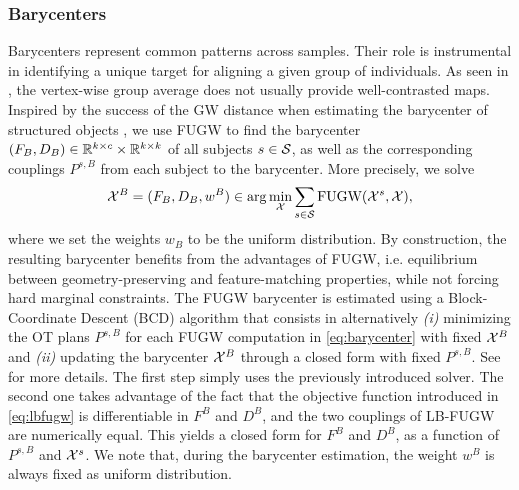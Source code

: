 \subsubsection{Barycenters}
Barycenters represent common patterns across samples.
Their role is instrumental in identifying a unique target for aligning a given group of individuals.
As seen in , the vertex-wise group average does not usually provide
well-contrasted maps.
Inspired by the success of the GW distance when estimating the barycenter of structured objects
\citep{Peyre16,Vayer19b}, we use FUGW to find the barycenter
$(F_B, D_B) \in \mathbb R^{k \times c} \times \mathbb R^{k \times k}$
of all subjects $s \in \mathcal S$, as well as the corresponding couplings $P^{s,B}$ from each subject
to the barycenter. More precisely, we solve
\begin{equation}
    \label{eq:barycenter}
    \mathcal X^B = (F_B, D_B, w^B) \in \arg\min_{\mathcal X}  \sum_{s \in \mathcal S} \text{FUGW}(\mathcal X^s, \mathcal X),
\end{equation}
where we set the weights $w_B$ to be the uniform distribution.
By construction, the resulting barycenter benefits from the advantages of FUGW,
i.e. equilibrium between geometry-preserving and feature-matching properties,
while not forcing hard marginal constraints. The FUGW barycenter is estimated
using a Block-Coordinate Descent (BCD) algorithm that consists in alternatively
\textit{(i)} minimizing the OT plans $P^{s,B}$ for each FUGW computation
in \eqref{eq:barycenter} with fixed $\mathcal X^B$ and \textit{(ii)}
updating the barycenter $\mathcal X^B$ through a closed form with fixed $P^{s,B}$.
See  for more details.
The first step simply uses the previously introduced solver.
The second one takes advantage of the fact that the objective function introduced
in \eqref{eq:lbfugw} is differentiable in $F^B$ and $D^B$, and the two couplings of
LB-FUGW are numerically equal. This yields a closed form for $F^B$ and $D^B$,
as a function of $P^{s,B}$ and $\mathcal X^s$. We note that, during the barycenter estimation,
the weight $w^B$ is always fixed as uniform distribution.

